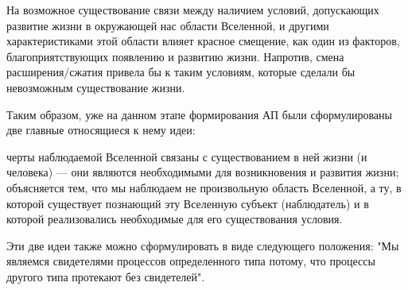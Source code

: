 На возможное существование связи между наличием условий, допускающих развитие жизни в окружающей нас области Вселенной, и другими характеристиками этой области влияет красное смещение, как один из факторов, благоприятствующих появлению и развитию жизни. Напротив, смена расширения/сжатия привела бы к таким условиям, которые сделали бы невозможным существование жизни.


Таким образом, уже на данном этапе формирования АП были сформулированы две главные относящиеся к нему идеи: 

\begin{itemize}
 черты наблюдаемой Вселенной связаны с существованием в ней жизни (и человека) --- они являются необходимыми для возникновения и развития жизни;
 объясняется тем, что мы наблюдаем не произвольную область Вселенной, а ту, в которой существует познающий эту Вселенную субъект (наблюдатель) и в которой реализовались необходимые для его существования условия. 
 \end{itemize}
 
Эти две идеи также можно сформулировать в виде следующего положения:
"Мы являемся свидетелями процессов определенного типа потому, что процессы другого типа протекают без свидетелей".


\clearpage


